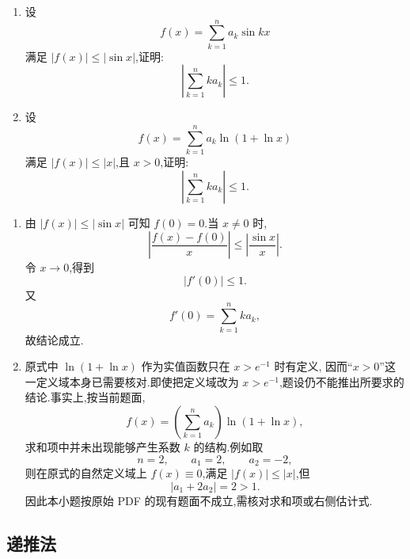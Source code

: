 \begin{example}
    \begin{enumerate}
        \item 设
              \[
                  f(x)=\sum\limits_{k=1}^n a_k\sin kx
              \]
              满足 $|f(x)|\leq|\sin x|$,证明:
              \[
                  \left|\sum\limits_{k=1}^n ka_k\right|\leq1.
              \]
        \item 设
              \[
                  f(x)=\sum\limits_{k=1}^n a_k\ln(1+\ln x)
              \]
              满足 $|f(x)|\leq|x|$,且 $x>0$,证明:
              \[
                  \left|\sum\limits_{k=1}^n ka_k\right|\leq1.
              \]
    \end{enumerate}
\end{example}
\exampleblank

\begin{solution}
    \begin{enumerate}
        \item 由 $|f(x)|\leq|\sin x|$ 可知 $f(0)=0$.当 $x\neq0$ 时,
              \[
                  \left|\dfrac{f(x)-f(0)}{x}\right|
                  \leq\left|\dfrac{\sin x}{x}\right|.
              \]
              令 $x\to0$,得到
              \[
                  |f'(0)|\leq1.
              \]
              又
              \[
                  f'(0)=\sum\limits_{k=1}^{n}ka_k,
              \]
              故结论成立.
        \item 原式中 $\ln(1+\ln x)$ 作为实值函数只在 $x>e^{-1}$ 时有定义,
              因而“$x>0$”这一定义域本身已需要核对.即使把定义域改为 $x>e^{-1}$,题设仍不能推出所要求的结论.事实上,按当前题面,
              \[
                  f(x)=\left(\sum\limits_{k=1}^{n}a_k\right)\ln(1+\ln x),
              \]
              求和项中并未出现能够产生系数 $k$ 的结构.例如取
              \[
                  n=2,
                  \qquad
                  a_1=2,
                  \qquad
                  a_2=-2,
              \]
              则在原式的自然定义域上 $f(x)\equiv0$,满足 $|f(x)|\leq|x|$,但
              \[
                  |a_1+2a_2|=2>1.
              \]
              因此本小题按原始 PDF 的现有题面不成立,需核对求和项或右侧估计式.
    \end{enumerate}
\end{solution}



\subsection{递推法}

